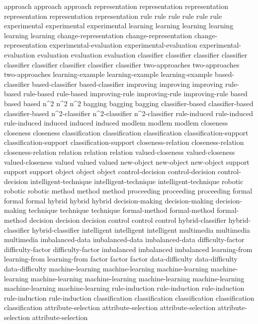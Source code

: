 approach	approach	approach	
representation	representation	representation	representation	representation	representation	
rule	rule	rule	rule	rule	rule	
experimental	experimental	experimental	
learning	learning	learning	learning	learning	learning	
change-representation	change-representation	change-representation	
experimental-evaluation	experimental-evaluation	experimental-evaluation	
evaluation	evaluation	evaluation	
classifier	classifier	classifier	classifier	classifier	classifier	classifier	classifier	classifier	
two-approaches	two-approaches	two-approaches	
learning-example	learning-example	learning-example	
based-classifier	based-classifier	based-classifier	
improving	improving	improving	
rule-based	rule-based	rule-based	
improving-rule	improving-rule	improving-rule	
based	based	based	
n^2	n^2	n^2	
bagging	bagging	bagging	
classifier-based	classifier-based	classifier-based	
n^2-classifier	n^2-classifier	n^2-classifier	
rule-induced	rule-induced	rule-induced	
induced	induced	induced	
modlem	modlem	modlem	
closeness	closeness	closeness	
classification	classification	classification	
classification-support	classification-support	classification-support	
closeness-relation	closeness-relation	closeness-relation	
relation	relation	relation	
valued-closeness	valued-closeness	valued-closeness	
valued	valued	valued	
new-object	new-object	new-object	
support	support	support	
object	object	object	
control-decision	control-decision	control-decision	
intelligent-technique	intelligent-technique	intelligent-technique	
robotic	robotic	robotic	
method	method	method	
proceeding	proceeding	proceeding	
formal	formal	formal	
hybrid	hybrid	hybrid	
decision-making	decision-making	decision-making	
technique	technique	technique	
formal-method	formal-method	formal-method	
decision	decision	decision	
control	control	control	
hybrid-classifier	hybrid-classifier	hybrid-classifier	
intelligent	intelligent	intelligent	
multimedia	multimedia	multimedia	
imbalanced-data	imbalanced-data	imbalanced-data	
difficulty-factor	difficulty-factor	difficulty-factor	
imbalanced	imbalanced	imbalanced	
learning-from	learning-from	learning-from	
factor	factor	factor	
data-difficulty	data-difficulty	data-difficulty	
machine-learning	machine-learning	machine-learning	machine-learning	machine-learning	machine-learning	machine-learning	machine-learning	machine-learning	machine-learning	
rule-induction	rule-induction	rule-induction	rule-induction	rule-induction	
classification	classification	classification	classification	classification	
attribute-selection	attribute-selection	attribute-selection	attribute-selection	attribute-selection	
